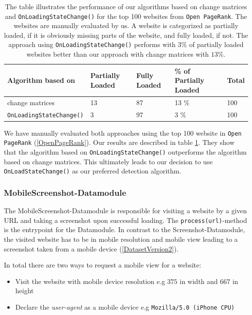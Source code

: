 \begin{table}[]
	\centering
	\begin{tabular}{lllll}
		Algorithm based on & Partially Loaded & Fully Loaded & \% of Partially Loaded  & Total \\ \hline \hline
		change matrices & 13 & 87 & 13 \% & 100 \\ \hline
		\texttt{OnLoadingStateChange()} & 3 &  97 & 3 \% & 100
	\end{tabular}
\caption{The table illustrates the performance of our algorithms based on change matrices and \texttt{OnLoadingStateChange()} for the top 100 websites from \texttt{Open PageRank}. The websites are manually evaluated by us. A website is categorized as partially loaded, if it is obviously missing parts of the website, and fully loaded, if not. The approach using \texttt{OnLoadingStateChange()} performs with $3\%$ of partially loaded websites better than our approach with change matrices with $13\%$. }
\label{table_compare_algorithm_screenshot}
\end{table}

We have manually evaluated both approaches using the top 100 website in \texttt{Open PageRank} (\ref{OpenPageRank}). Our results are described in table \ref{table_compare_algorithm_screenshot}. They show that the algorithm based on \texttt{OnLoadingStateChange()} outperforms the algorithm based on change matrices. This ultimately leads to our decision to use \texttt{OnLoadStateChange()} as our preferred detection algorithm.

\subsubsection{MobileScreenshot-Datamodule}
\label{datacrawler_mobilescreenshot_datamodule}
The MobileScreenshot-Datamodule is responsible for visiting a website by a given URL and taking a screenshot upon successful loading. The \texttt{process(url)}-method is the entrypoint for the Datamodule. In contrast to the Screenshot-Datamodule, the visited website has to be in mobile resolution and mobile view leading to a screenshot taken from a mobile device (\ref{DatasetVersion2}).

In total there are two ways to request a mobile view for a website:

\begin{itemize}
	\item Visit the website with mobile device resolution e.g $375$ in width and $667$ in height
	\item Declare the \textit{user-agent} as a mobile device e.g  \texttt{Mozilla/5.0 (iPhone CPU)}
\end{itemize}

